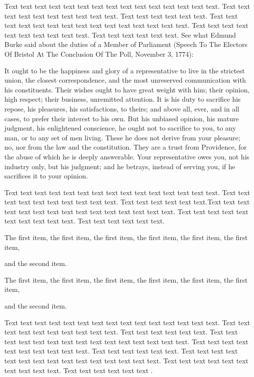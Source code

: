 Text text text text text text text text text text text text text text text. Text text text text text text text text text text. Text text text text text text. Text text text text text text text text text text text text text text text. Text text text text text text text text text text. Text text text text text text. See what Edmund Burke said about the duties of a Member of Parliament (Speech To The Electors Of Bristol At The Conclusion Of The Poll, November 3, 1774):

\begin{quotesmall}
It ought to be the happiness and glory of a representative to live in the strictest union, the closest correspondence, and the most unreserved communication with his constituents. Their wishes ought to have great weight with him; their opinion, high respect; their business, unremitted attention. It is his duty to sacrifice his repose, his pleasures, his satisfactions, to theirs; and above all, ever, and in all cases, to prefer their interest to his own. But his unbiased opinion, his mature judgment, his enlightened conscience, he ought not to sacrifice to you, to any man, or to any set of men living. These he does not derive from your pleasure; no, nor from the law and the constitution. They are a trust from Providence, for the abuse of which he is deeply answerable. Your representative owes you, not his industry only, but his judgment; and he betrays, instead of serving you, if he sacrifices it to your opinion.
\end{quotesmall}

Text text text text text text text text text text text text text text text. Text text text text text text text text text text. Text text text text text text.Text text text text text text text text text text text text text text text. Text text text text text text text text text text. Text text text text text text.

\begin{listi}
	\item The first item, the first item, the first item, the first item, the first item, the first item,
	\item and the second item.
\end{listi}

\begin{lista}
	\item The first item, the first item, the first item, the first item, the first item, the first item, 
	\item and the second item.
\end{lista}

Text text text text text text text text text text text text text text text. Text text text text text text text text text text. Text text text text text text. Text text text text text text text text text text text text text text text. Text text text text text text text text text text. Text text text text text text. Text text text text text text text text text text text text text text text. Text text text text text text text text text text. Text text text text text text \citet{Blomstrom2003}. 
